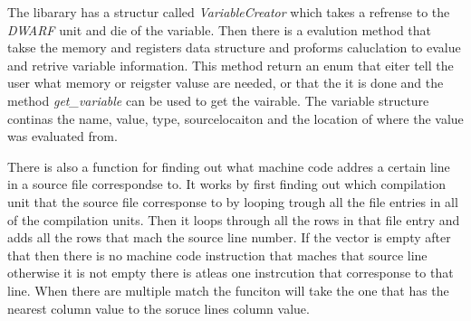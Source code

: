 The libarary has a structur called \emph{VariableCreator} which  takes a refrense to the \emph{DWARF} unit and die of the variable.
Then there is a evalution method that takse the memory and registers data structure and proforms caluclation to evalue and retrive variable information.
This method return an enum that eiter tell the user what memory or reigster valuse are needed, or that the it is done and the method \emph{get\_variable} can be used to get the vairable.
The variable structure continas the name, value, type, sourcelocaiton and the location of where the value was evaluated from.


There is also a function for finding out what machine code addres a certain line in a source file correspondse to.
It works by first finding out which compilation unit that the source file corresponse to by looping trough all the file entries in all of the compilation units. 
Then it loops through all the rows in that file entry and adds all the rows that mach the source line number.
If the vector is empty after that then there is no machine code instruction that maches that source line otherwise it is not empty there is atleas one instrcution that corresponse to that line.
When there are multiple match the funciton will take the one that has the nearest column value to the soruce lines column value.

